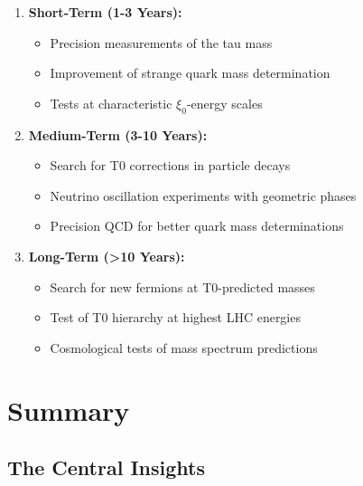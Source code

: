 \documentclass[12pt,a4paper]{article}
\begin{document}
	\begin{enumerate}
		\item \textbf{Short-Term (1-3 Years):}
		\begin{itemize}
			\item Precision measurements of the tau mass
			\item Improvement of strange quark mass determination
			\item Tests at characteristic $\xi_0$-energy scales
		\end{itemize}
		
		\item \textbf{Medium-Term (3-10 Years):}
		\begin{itemize}
			\item Search for T0 corrections in particle decays
			\item Neutrino oscillation experiments with geometric phases
			\item Precision QCD for better quark mass determinations
		\end{itemize}
		
		\item \textbf{Long-Term (>10 Years):}
		\begin{itemize}
			\item Search for new fermions at T0-predicted masses
			\item Test of T0 hierarchy at highest LHC energies
			\item Cosmological tests of mass spectrum predictions
		\end{itemize}
	\end{enumerate}
	
	\section{Summary}
	
	\subsection{The Central Insights}
	
\end{document}
